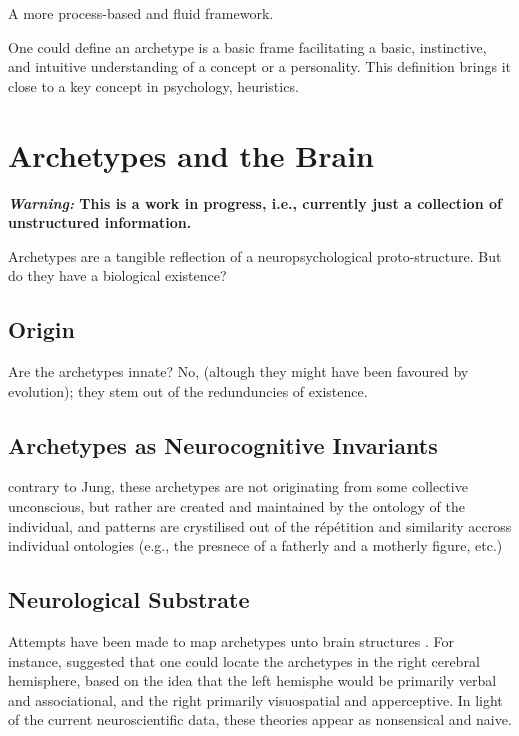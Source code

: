 \documentclass[
]{book}
\begin{document}
A more process-based and fluid framework.

One could define an archetype is a basic frame facilitating a basic, instinctive, and intuitive understanding of a concept or a personality. This definition brings it close to a key concept in psychology, heuristics.

\hypertarget{archetypes-and-the-brain}{%
\chapter{Archetypes and the Brain}\label{archetypes-and-the-brain}}

\textbf{\emph{Warning:} This is a work in progress, i.e., currently just a collection of unstructured information.}

Archetypes are a tangible reflection of a neuropsychological proto-structure. But do they have a biological existence?

\hypertarget{origin}{%
\section{Origin}\label{origin}}

Are the archetypes innate? No, (altough they might have been favoured by evolution); they stem out of the redunduncies of existence.

\hypertarget{archetypes-as-neurocognitive-invariants}{%
\section{Archetypes as Neurocognitive Invariants}\label{archetypes-as-neurocognitive-invariants}}

contrary to Jung, these archetypes are not originating from some collective unconscious, but rather are created and maintained by the ontology of the individual, and patterns are crystilised out of the répétition and similarity accross individual ontologies (e.g., the presnece of a fatherly and a motherly figure, etc.)

\hypertarget{neurological-substrate}{%
\section{Neurological Substrate}\label{neurological-substrate}}

Attempts have been made to map archetypes unto brain structures \citep{samuels2003jung}. For instance, \citet{rossi1977cerebral} suggested that one could locate the archetypes in the right cerebral hemisphere, based on the idea that the left hemisphe would be primarily verbal and associational, and the right primarily visuospatial and apperceptive. In light of the current neuroscientific data, these theories appear as nonsensical and naive.
\end{document}
